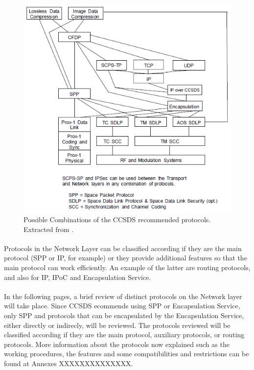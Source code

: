 \begin{figure}[H]
\begin{center}
\includegraphics[scale=0.6]{CCSDScombinations.PNG}
\caption[Combination of CCSDS Recommended Protocols]{Possible Combinations of the CCSDS recommended protocols. Extracted from \cite{CCSDSOverview}.}
\label{fig:CCSDScombinations}
\end{center}
\end{figure}
\paragraph{}Protocols in the Network Layer can be classified according if they are the main protocol (SPP or IP, for example) or they provide additional features so that the main protocol can work efficiently. An example of the latter are routing protocols, and also for IP, IPoC and Encapsulation Service.
\paragraph{}In the following pages, a brief review of distinct protocols on the Network layer will take place. Since CCSDS ecommends using SPP or Encapsulation Service, only SPP and protocols that can be encapsulated by the Encapsulation Service, either directly or indirecly, will be reviewed. The protocols reviewed will be classified according if they are the main protocol, auxiliary protocols, or routing protocols. More information about the protocols now explained such as the working procedures, the features and some compatibilities and restrictions can be found at Annexes XXXXXXXXXXXXXX.

